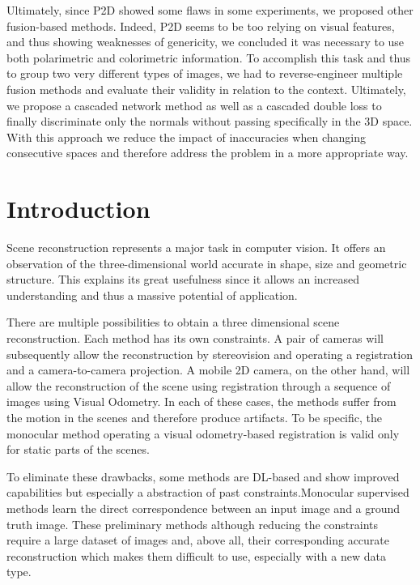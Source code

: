 Ultimately, since P2D showed some flaws in some experiments, we proposed other fusion-based methods. 
Indeed, P2D seems to be too relying on visual features, and thus showing weaknesses of genericity, we concluded it was necessary to use both polarimetric and colorimetric information. To accomplish this task and thus to group two very different types of images, we had to reverse-engineer multiple fusion methods and evaluate their validity in relation to the context. Ultimately, we propose a cascaded network method as well as a cascaded double loss to finally discriminate only the normals without passing specifically in the 3D space. With this approach we reduce the impact of inaccuracies when changing consecutive spaces and therefore address the problem in a more appropriate way.

\section{Introduction}
Scene reconstruction represents a major task in computer vision. It offers an observation of the three-dimensional world accurate in shape, size and geometric structure. This explains its great usefulness since it allows an increased understanding and thus a massive potential of application.

There are multiple possibilities to obtain a three dimensional scene reconstruction. Each method has its own constraints. A pair of cameras will subsequently allow the reconstruction by stereovision and operating a registration and a camera-to-camera projection.
A mobile 2D camera, on the other hand, will allow the reconstruction of the scene using registration through a sequence of images using Visual Odometry.
In each of these cases, the methods suffer from the motion in the scenes and therefore produce artifacts. To be specific, the monocular method operating a visual odometry-based registration is valid only for static parts of the scenes.

To eliminate these drawbacks, some methods are DL-based and show improved capabilities but especially a abstraction of past constraints.Monocular supervised methods learn the direct correspondence between an input image and a ground truth image. These preliminary methods although reducing the constraints require a large dataset of images and, above all, their corresponding accurate reconstruction which makes them difficult to use, especially with a new data type. 

